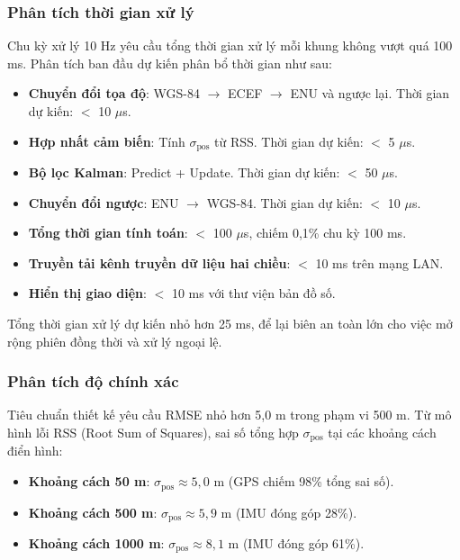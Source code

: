 \subsubsection{Phân tích thời gian xử lý}

\hspace{0.5cm} Chu kỳ xử lý 10 Hz yêu cầu tổng thời gian xử lý mỗi khung không vượt quá 100 ms. Phân tích ban đầu dự kiến phân bổ thời gian như sau:

\begin{itemize}
    \item \textbf{Chuyển đổi tọa độ}: WGS-84 $\rightarrow$ ECEF $\rightarrow$ ENU và ngược lại. Thời gian dự kiến: $<$ 10 $\mu$s.
    \item \textbf{Hợp nhất cảm biến}: Tính $\sigma_{\text{pos}}$ từ RSS. Thời gian dự kiến: $<$ 5 $\mu$s.
    \item \textbf{Bộ lọc Kalman}: Predict + Update. Thời gian dự kiến: $<$ 50 $\mu$s.
    \item \textbf{Chuyển đổi ngược}: ENU $\rightarrow$ WGS-84. Thời gian dự kiến: $<$ 10 $\mu$s.
    \item \textbf{Tổng thời gian tính toán}: $<$ 100 $\mu$s, chiếm 0,1\% chu kỳ 100 ms.
    \item \textbf{Truyền tải kênh truyền dữ liệu hai chiều}: $<$ 10 ms trên mạng LAN.
    \item \textbf{Hiển thị giao diện}: $<$ 10 ms với thư viện bản đồ số.
\end{itemize}

Tổng thời gian xử lý dự kiến nhỏ hơn 25 ms, để lại biên an toàn lớn cho việc mở rộng phiên đồng thời và xử lý ngoại lệ.

\subsubsection{Phân tích độ chính xác}

\hspace{0.5cm} Tiêu chuẩn thiết kế yêu cầu RMSE nhỏ hơn 5,0 m trong phạm vi 500 m. Từ mô hình lỗi RSS (Root Sum of Squares), sai số tổng hợp $\sigma_{\text{pos}}$ tại các khoảng cách điển hình:

\begin{itemize}
    \item \textbf{Khoảng cách 50 m}: $\sigma_{\text{pos}} \approx 5{,}0$ m (GPS chiếm 98\% tổng sai số).
    \item \textbf{Khoảng cách 500 m}: $\sigma_{\text{pos}} \approx 5{,}9$ m (IMU đóng góp 28\%).
    \item \textbf{Khoảng cách 1000 m}: $\sigma_{\text{pos}} \approx 8{,}1$ m (IMU đóng góp 61\%).
\end{itemize}

